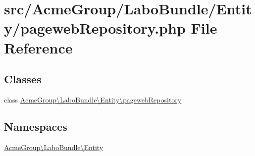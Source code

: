 \hypertarget{pageweb_repository_8php}{\section{src/\+Acme\+Group/\+Labo\+Bundle/\+Entity/pageweb\+Repository.php File Reference}
\label{pageweb_repository_8php}
}
\subsection*{Classes}
\begin{DoxyCompactItemize}
\item 
class \hyperlink{class_acme_group_1_1_labo_bundle_1_1_entity_1_1pageweb_repository}{Acme\+Group\textbackslash{}\+Labo\+Bundle\textbackslash{}\+Entity\textbackslash{}pageweb\+Repository}
\end{DoxyCompactItemize}
\subsection*{Namespaces}
\begin{DoxyCompactItemize}
\item 
 \hyperlink{namespace_acme_group_1_1_labo_bundle_1_1_entity}{Acme\+Group\textbackslash{}\+Labo\+Bundle\textbackslash{}\+Entity}
\end{DoxyCompactItemize}
